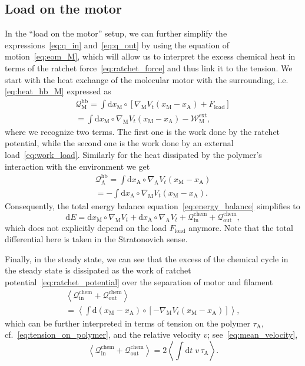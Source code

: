 \documentclass[aps,pre,twocolumn,showpacs,showkeys,superscriptaddress,floatfix]{revtex4-1}
\newcommand{\rmd}{{\mathrm d}}
\begin{document}
\subsection{Load on the motor}
In the ``load on the motor'' setup, we can further simplify the expressions~\eqref{eq:q_in} and~\eqref{eq:q_out} 
by using the equation of motion~\eqref{eq:eom_M}, 
which will allow us to interpret the excess chemical heat in terms of the ratchet force~\eqref{eq:ratchet_force} and thus link it to the tension.  
We start with the heat exchange of the molecular motor with the surrounding, i.e. \eqref{eq:heat_hb_M} expressed as 
\begin{multline}
{\mathcal Q}_\text{M}^\text{hb} 
= \int \rmd x_\text{M} \circ \left[ \nabla_\text{M} V_t(x_\text{M} - x_\text{A} ) + F_\text{load} \right] 
\\
= \int \rmd x_\text{M} \circ \nabla_\text{M} V_t(x_\text{M} - x_\text{A} ) - {\mathcal W}_\text{M}^\text{ext} ,
\label{eq:heat_hb_M_expl}
\end{multline}
where we recognize two terms. 
The first one is the work done by the ratchet potential, while the second one is the work done by an external load~\eqref{eq:work_load}. 
Similarly for the heat dissipated by the polymer's interaction with the environment we get 
\begin{multline}
{\mathcal Q}_\text{A}^\text{hb} 
= \int \rmd x_\text{A} \circ \nabla_\text{A} V_t(x_\text{M} - x_\text{A} )
\\
= - \int \rmd x_\text{A} \circ \nabla_\text{M} V_t(x_\text{M} - x_\text{A} ) .
\label{eq:heat_hb_A_expl}
\end{multline}
Consequently, the total energy balance equation~\eqref{eq:energy_balance} simplifies to 
\[
\rmd E 
= \rmd x_\text{M} \circ \nabla_\text{M} V_t  
+ \rmd x_\text{A} \circ \nabla_\text{A} V_t  
+ {\mathcal Q}_\text{in}^\text{chem}
+ {\mathcal Q}_\text{out}^\text{chem} , 
\]
which does not explicitly depend on the load $F_\text{load}$ anymore. 
Note that the total differential here is taken in the Stratonovich sense. 

Finally, in the steady state, 
we can see that the excess of the chemical cycle in the steady state is dissipated as the work of ratchet potential~\eqref{eq:ratchet_potential} over the separation of motor and filament 
\begin{multline}
\left\langle 
{\mathcal Q}_\text{in}^\text{chem} + {\mathcal Q}_\text{out}^\text{chem} 
\right\rangle 
\\
= 
\left\langle 
\int \rmd \left( x_\text{M} - x_\text{A} \right) \circ \left[ - \nabla_\text{M} V_t( x_\text{M} - x_\text{A} ) \right]
\right\rangle ,
\label{eq:chemical_excess}
\end{multline} 
which can be further interpreted in terms of tension on the polymer $\tau_\text{A}$, cf.~\eqref{eq:tension_on_polymer}, and the relative velocity $v$; see~\eqref{eq:mean_velocity}, 
\begin{equation}
\left\langle 
{\mathcal Q}_\text{in}^\text{chem} + {\mathcal Q}_\text{out}^\text{chem} 
\right\rangle 
= 2 \left\langle \int \rmd t \; v \, \tau_\text{A} \right\rangle .
\label{eq:excess_heat} 
\end{equation}
\end{document}
